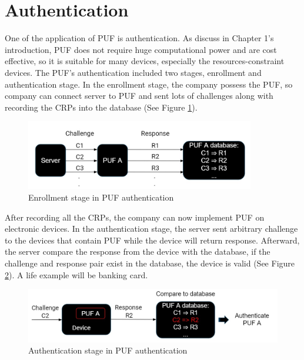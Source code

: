 \section{Authentication}
One of the application of PUF is authentication. As discuss in Chapter 1's introduction, PUF does not require huge computational power and are cost effective, so it is suitable for many devices,
especially the resources-constraint devices. The PUF's authentication included two stages, enrollment and authentication stage. In the enrollment stage, the company possess the PUF, so
company can connect server to PUF and sent lots of challenges along with recording the CRPs into the database \cite{Reference2} (See Figure \ref{fig:figure4}).

\begin{figure}[ht]
    \centering
    \includegraphics[width=10cm]{figures/figure4.jpg}
    \caption{Enrollment stage in PUF authentication}
    \label{fig:figure4}
    \end{figure}

After recording all the CRPs, the company can now implement PUF on electronic devices.
In the authentication stage, the server sent arbitrary challenge to the devices that contain PUF while the device will return response. Afterward, the server compare the response from the device with the database, 
if the challenge and response pair exist in the database, the device is valid \cite{Reference2} (See Figure \ref{fig:figure5}). A life example will be banking card.

\begin{figure}[ht]
    \centering
    \includegraphics[width=12cm]{figures/figure5.jpg}
    \caption{Authentication stage in PUF authentication}
    \label{fig:figure5}
    \end{figure}

